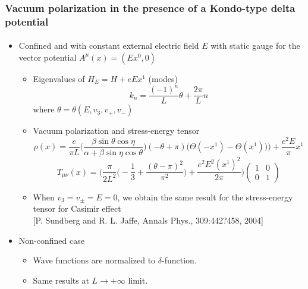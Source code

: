 \documentclass[english]{beamer}
\begin{document}
\begin{frame}[shrink=30]
\frametitle{\small{Vacuum polarization in the presence of a Kondo-type delta potential}}
\framesubtitle{}

\begin{itemize}

\item<1-> Confined and with constant external electric field $E$ with static gauge for the vector potential $A^\mu(x) = (Ex^0, 0)$

\begin{itemize}
\item<2-> Eigenvalues of $H_E = H + eEx^1 $ (modes)
\begin{equation*}
k_{n} = \frac{(-1)^n}{L}  \theta + \frac{2\pi}{L}n 
\end{equation*}
where $\theta = \theta(E, v_3, v_+, v_-)$
%
\item<3-> Vacuum polarization and stress-energy tensor
\begin{equation*}
\rho(x) = \frac{e}{\pi L}\Big( \frac{\beta \sin \theta \cos \eta}{\alpha + \beta \sin \eta \cos \theta}\Big) (-\theta + \pi)
\Big(\Theta(- x^1) - \Theta(x^1))\Big) + \frac{e^2 E}{\pi} x^1
\end{equation*}
%
\begin{equation*}
T_{\mu\nu}(x) = 
\bigg( \frac{\pi}{2L^2}\big( -\frac{1}{3} + \frac{(\theta - \pi)^2}{\pi^2}\big) + \frac{e^2E^2(x^1)^2}{2 \pi} \bigg)
\begin{pmatrix}
1 & 0 \\ 0 & 1
\end{pmatrix}
\end{equation*}
%
\item<3-> When $v_3 = v_\pm = E = 0$, we obtain the same result for the stress-energy tensor for Casimir effect \\
\tiny\color{blue}[P. Sundberg and R. L. Jaffe, Annals Phys., 309:442?458, 2004]\normalsize\color{black}
\end{itemize}
%
\item Non-confined case
\begin{itemize}
\item<4-> Wave functions are normalized to $\delta$-function.
\item<5-> Same results at $L\rightarrow +\infty $ limit.
\end{itemize}

\end{itemize}

\end{frame}
\end{document}
